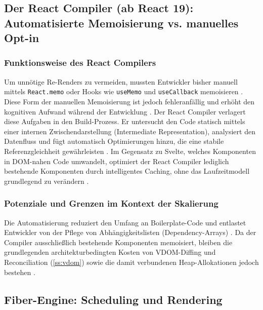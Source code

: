 \subsection{Der React Compiler (ab React 19): Automatisierte Memoisierung vs. manuelles Opt-in}
\label{ss:react-compiler}

\subsubsection{Funktionsweise des React Compilers}
\label{sss:react-compiler}

Um unnötige Re-Renders zu vermeiden, mussten Entwickler bisher manuell mittels \texttt{React.memo} oder Hooks wie \texttt{useMemo} und \texttt{useCallback} memoisieren \cite{kumar-fluentreact-2024}. Diese Form der manuellen Memoisierung ist jedoch fehleranfällig und erhöht den kognitiven Aufwand während der Entwicklung \cite{react_introduction}. Der React Compiler verlagert diese Aufgaben in den Build-Prozess. Er untersucht den Code statisch mittels einer internen Zwischendarstellung (Intermediate Representation), analysiert den Datenfluss und fügt automatisch Optimierungen hinzu, die eine stabile Referenzgleichheit gewährleisten \cite{react_compiler_2025}. Im Gegensatz zu Svelte, welches Komponenten in DOM-nahen Code umwandelt, optimiert der React Compiler lediglich bestehende Komponenten durch intelligentes Caching, ohne das Laufzeitmodell grundlegend zu verändern \cite{kumar-fluentreact-2024}.


\subsubsection{Potenziale und Grenzen im Kontext der Skalierung}
\label{sss:potentials-and-limitations}

Die Automatisierung reduziert den Umfang an Boilerplate-Code und entlastet Entwickler von der Pflege von Abhängigkeitslisten (Dependency-Arrays) \cite{react_introduction}. Da der Compiler ausschließlich bestehende Komponenten memoisiert, bleiben die grundlegenden architekturbedingten Kosten von VDOM-Diffing und Reconciliation (\cref{ss:vdom}) sowie die damit verbundenen Heap-Allokationen jedoch bestehen \cite{kumar-fluentreact-2024, thedatascientist_vdom}.

\subsection{Fiber-Engine: Scheduling und Rendering}
\label{ss:fiber-engine}

